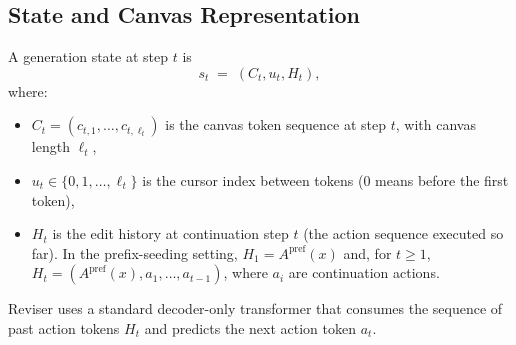 \documentclass[11pt]{article}
\DeclareRobustCommand{\ph}[1]{#1}
\DeclareRobustCommand{\phA}{A}
\DeclareRobustCommand{\ph}[1]{\ifmmode\text{\phoenicianfont #1}\else{\phoenicianfont #1}\fi}
\DeclareRobustCommand{\phA}{\ph{\char"10900}} %
\DeclareRobustCommand{\ph}[1]{#1}
\DeclareRobustCommand{\phA}{A}
\begin{document}
\subsection{State and Canvas Representation}
\label{sec:state}

A generation state at step $t$ is
\[
s_t \;=\; (C_t, u_t, H_t),
\]
where:
\begin{itemize}[leftmargin=*,itemsep=0.2em]
\item $C_t = (c_{t,1}, \dots, c_{t,\ell_t})$ is the canvas token sequence at step $t$, with canvas length $\ell_t$,
\item $u_t \in \{0,1,\dots,\ell_t\}$ is the cursor index between tokens (0 means before the first token),
\item $H_t$ is the edit history at continuation step $t$ (the action sequence executed so far). In the prefix-seeding setting, $H_1=\phA^{\text{pref}}(x)$ and, for $t\ge 1$, $H_t=(\phA^{\text{pref}}(x),a_1,\dots,a_{t-1})$, where $a_i$ are continuation actions.
\end{itemize}

Reviser uses a standard decoder-only transformer that consumes the sequence of past action tokens $H_t$ and predicts the next action token $a_t$.
\end{document}
